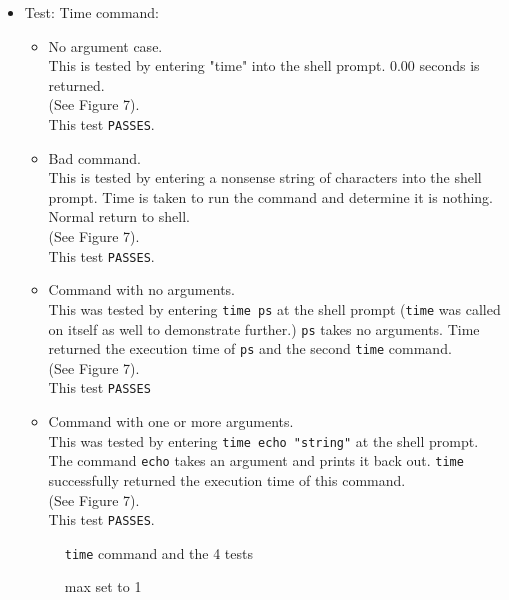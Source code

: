 \documentclass[11pt,letterpaper]{report}
\begin{document}
	\begin{itemize}
	
	\item Test: Time command:
	\begin{itemize}
		\item No argument case.\\
		This is tested by entering "time" into the shell prompt. 0.00 seconds is returned.\\
		(See Figure 7).\\
		This test {\tt PASSES}.
		\item Bad command.\\
		This is tested by entering a nonsense string of characters into the shell prompt. Time is taken to run the command and determine it is nothing. Normal return to shell.\\
		(See Figure 7).\\		
		This test {\tt PASSES}.
		\item Command with no arguments.\\
		This was tested by entering {\tt time ps} at the shell prompt ({\tt time} was called on itself as well to demonstrate further.) {\tt ps} takes no arguments. Time returned the execution time of {\tt ps} and the second {\tt time} command.\\
		(See Figure 7).\\
		This test {\tt PASSES}
		\item Command with one or more arguments.\\
		This was tested by entering {\tt time echo "string"} at the shell prompt. The command {\tt echo} takes an argument and prints it back out. {\tt time} successfully returned the execution time of this command.\\
		(See Figure 7).\\
		This test {\tt PASSES}.
	\end{itemize}

\begin{figure}[h!]
	\centering
	\caption[ctrlpps]{{\tt time} command and the 4 tests}
	\label{fig:timetests}
\end{figure}

\begin{figure}[h!]
	\centering
	\caption[ctrlpps]{max set to 1}
	\label{fig:setmax1}
\end{figure}


\end{itemize}
\end{document}
